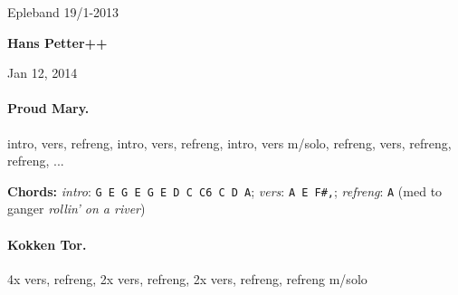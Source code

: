 \documentclass[%
twoside,                 %
final,                   %
10pt]{article}
\begin{document}




\thispagestyle{empty}

\begin{center}
{\LARGE\bf
\begin{spacing}{1.25}
Epleband 19/1-2013
\end{spacing}
}
\end{center}




\begin{center}
{\bf Hans Petter++${}^{}$} \\ [0mm]
\end{center}

\begin{center}
\end{center}


\begin{center}
Jan 12, 2014
\end{center}

\vspace{1cm}



\tableofcontents

\vspace{1cm} %





\paragraph{Proud Mary.}
intro, vers, refreng, intro, vers, refreng, intro, vers m/solo, refreng,
vers, refreng, refreng, ...

\textbf{Chords:} \emph{intro}: \Verb!G E G E G E D C C6 C D A!;
\emph{vers}: \Verb!A E F#,!; \emph{refreng}: \Verb!A! (med to ganger \emph{rollin' on a river})




\paragraph{Kokken Tor.}
4x vers, refreng, 2x vers, refreng, 2x vers, refreng, refreng m/solo
\end{document}
